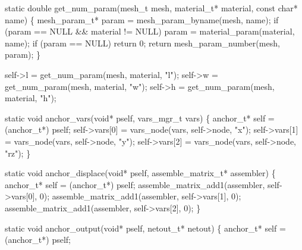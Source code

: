 \nwenddocs{}\endmoddef
static double get_num_param(mesh_t mesh,
                            material_t* material,
                            const char* name)
\{
    mesh_param_t* param = mesh_param_byname(mesh, name);
    if (param == NULL && material != NULL)
        param = material_param(material, name);
    if (param == NULL)
        return 0;
    return mesh_param_number(mesh, param);
\}

\nwendcode{}\nwdocspar

\nwenddocs{}\endmoddef
self->l = get_num_param(mesh, material, "l");
self->w = get_num_param(mesh, material, "w");
self->h = get_num_param(mesh, material, "h");

\nwendcode{}\nwdocspar

\nwenddocs{}\plusendmoddef
static void anchor_vars(void* pself, vars_mgr_t vars)
\{
    anchor_t* self = (anchor_t*) pself;
    self->vars[0] = vars_node(vars, self->node, "x");
    self->vars[1] = vars_node(vars, self->node, "y");
    self->vars[2] = vars_node(vars, self->node, "rz");
\}

\nwendcode{}\nwdocspar

\nwenddocs{}\plusendmoddef
static void anchor_displace(void* pself, assemble_matrix_t* assembler)
\{
    anchor_t* self = (anchor_t*) pself;
    assemble_matrix_add1(assembler, self->vars[0], 0);
    assemble_matrix_add1(assembler, self->vars[1], 0);
    assemble_matrix_add1(assembler, self->vars[2], 0);
\}

\nwendcode{}\nwdocspar

\nwenddocs{}\plusendmoddef
static void anchor_output(void* pself, netout_t* netout)
\{
    anchor_t* self = (anchor_t*) pself;

